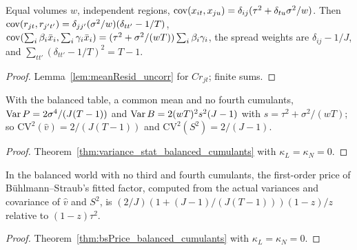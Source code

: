 \begin{lemma}\label{lem:bsCov}
  \leanok
  Equal volumes $w$, independent regions, $\operatorname{cov}(x_{it}, x_{ju}) = \delta_{ij}(\tau^2 + \delta_{tu}\sigma^2/w)$.
  Then $\operatorname{cov}(r_{jt}, r_{j't'}) = \delta_{jj'}(\sigma^2/w)(\delta_{tt'} - 1/T)$,
  $\operatorname{cov}(\sum_i\beta_i\bar x_i, \sum_i\gamma_i\bar x_i) = (\tau^2 + \sigma^2/(wT))\sum_i\beta_i\gamma_i$,
  the spread weights are $\delta_{ij} - 1/J$, and $\sum_{tt'}(\delta_{tt'} - 1/T)^2 = T - 1$.
\end{lemma}
\begin{proof}
  \leanok
  Lemma~\ref{lem:meanResid_uncorr} for $C r_{jt}$; finite sums.
\end{proof}

\begin{theorem}\label{thm:variance_stat_balanced}
  \leanok
  With the balanced table, a common mean and no fourth cumulants,
  $\operatorname{Var} P = 2\sigma^4/(J(T - 1))$ and $\operatorname{Var} B = 2(wT)^2s^2(J - 1)$ with $s = \tau^2 + \sigma^2/(wT)$;
  so $\mathrm{CV}^2(\hat v) = 2/(J(T - 1))$ and $\mathrm{CV}^2(S^2) = 2/(J - 1)$.
\end{theorem}
\begin{proof}
  \leanok
  Theorem~\ref{thm:variance_stat_balanced_cumulants} with $\kappa_L = \kappa_N = 0$.
\end{proof}

\begin{theorem}\label{thm:bsPrice_balanced_cells}
  \leanok
  In the balanced world with no third and fourth cumulants, the first-order price of
  Bühlmann--Straub's fitted factor, computed from the actual variances and covariance of $\hat v$
  and $S^2$, is $(2/J)(1 + (J - 1)/(J(T - 1)))(1 - z)/z$ relative to $(1 - z)\tau^2$.
\end{theorem}
\begin{proof}
  \leanok
  Theorem~\ref{thm:bsPrice_balanced_cumulants} with $\kappa_L = \kappa_N = 0$.
\end{proof}

